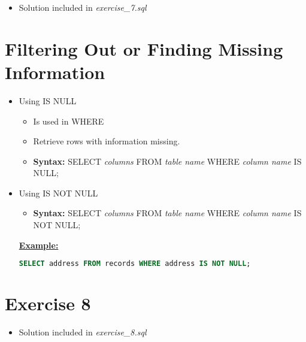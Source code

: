 \documentclass[12pt]{article}
\begin{document}
\bigskip

\begin{itemize}
    \item Solution included in \textit{exercise\_7.sql}
\end{itemize}

\bigskip

\section{Filtering Out or Finding Missing Information}

\bigskip

\begin{itemize}
    \item Using IS NULL
    \begin{itemize}
        \item Is used in WHERE
        \item Retrieve rows with information missing.
        \item \textbf{Syntax:} SELECT \textit{columns} FROM \textit{table name} WHERE \textit{column name} IS NULL;
    \end{itemize}
    \item Using IS NOT NULL
    \begin{itemize}
        \item \textbf{Syntax:} SELECT \textit{columns} FROM \textit{table name} WHERE \textit{column name} IS NOT NULL;
    \end{itemize}

    \bigskip

    \underline{\textbf{Example:}}

    \bigskip

    \begin{lstlisting}[language=SQL]
    SELECT address FROM records WHERE address IS NOT NULL;
    \end{lstlisting}
\end{itemize}

\bigskip

\section{Exercise 8}

\bigskip

\begin{itemize}
    \item Solution included in \textit{exercise\_8.sql}
\end{itemize}
\end{document}
